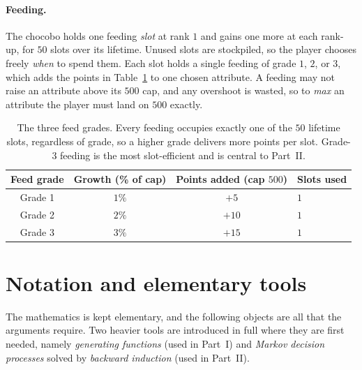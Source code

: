 \documentclass[11pt]{article}
\theoremstyle{remark}
\begin{document}
\paragraph{Feeding.}
The chocobo holds one feeding \emph{slot} at rank $1$ and gains one more at each
rank-up, for $50$ slots over its lifetime. Unused slots are stockpiled, so the
player chooses freely \emph{when} to spend them. Each slot holds a single feeding of
grade $1$, $2$, or $3$, which adds the points in Table~\ref{tab:feed} to one chosen
attribute. A feeding may not raise an attribute above its $500$ cap, and any
overshoot is wasted, so to \emph{max} an attribute the player must land on $500$
exactly.

\begin{table}[h]
\centering
\begin{tabular}{@{}cccl@{}}
\toprule
Feed grade & Growth (\% of cap) & Points added (cap $500$) & Slots used \\
\midrule
Grade 1 & $1\%$ & $+5$  & $1$ \\
Grade 2 & $2\%$ & $+10$ & $1$ \\
Grade 3 & $3\%$ & $+15$ & $1$ \\
\bottomrule
\end{tabular}
\caption{The three feed grades. Every feeding occupies exactly one of the $50$
lifetime slots, regardless of grade, so a higher grade delivers more points per
slot. Grade-3 feeding is the most slot-efficient and is central to Part~II.}
\label{tab:feed}
\end{table}

\section{Notation and elementary tools}\label{sec:notation}

The mathematics is kept elementary, and the following objects are all that the
arguments require. Two heavier tools are introduced in full where they are first
needed, namely \emph{generating functions} (used in Part~I) and \emph{Markov
decision processes} solved by \emph{backward induction} (used in Part~II).
\end{document}
